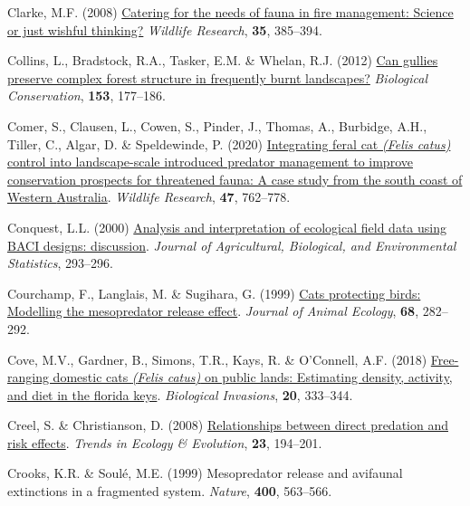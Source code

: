 \documentclass[11pt,a4paper,titlepage,twoside,openright]{style/unimelbthesis}
\newenvironment{CSLReferences}%
  {}%
  {\par}
\begin{document}
\begin{mainmatter}
\begin{CSLReferences}{1}{0}
\leavevmode{}%
Clarke, M.F. (2008) \href{https://doi.org/10.1071/WR07137}{Catering for the needs of fauna in fire management: Science or just wishful thinking?} \emph{Wildlife Research}, \textbf{35}, 385--394.

\leavevmode{}%
Collins, L., Bradstock, R.A., Tasker, E.M. \& Whelan, R.J. (2012) \href{https://doi.org/10.1016/j.biocon.2012.04.021}{Can gullies preserve complex forest structure in frequently burnt landscapes?} \emph{Biological Conservation}, \textbf{153}, 177--186.

\leavevmode{}%
Comer, S., Clausen, L., Cowen, S., Pinder, J., Thomas, A., Burbidge, A.H., Tiller, C., Algar, D. \& Speldewinde, P. (2020) \href{https://doi.org/10.1071/WR19217}{Integrating feral cat \emph{({Felis catus})} control into landscape-scale introduced predator management to improve conservation prospects for threatened fauna: A case study from the south coast of {Western {A}ustralia}}. \emph{Wildlife Research}, \textbf{47}, 762--778.

\leavevmode{}%
Conquest, L.L. (2000) \href{https://doi.org/10.2307/1400455}{Analysis and interpretation of ecological field data using {BACI} designs: discussion}. \emph{Journal of Agricultural, Biological, and Environmental Statistics}, 293--296.

\leavevmode{}%
Courchamp, F., Langlais, M. \& Sugihara, G. (1999) \href{https://doi.org/10.1046/j.1365-2656.1999.00285.x}{Cats protecting birds: Modelling the mesopredator release effect}. \emph{Journal of Animal Ecology}, \textbf{68}, 282--292.

\leavevmode{}%
Cove, M.V., Gardner, B., Simons, T.R., Kays, R. \& O'Connell, A.F. (2018) \href{https://doi.org/10.1007/s10530-017-1534-x}{Free-ranging domestic cats \emph{({Felis catus})} on public lands: Estimating density, activity, and diet in the florida keys}. \emph{Biological Invasions}, \textbf{20}, 333--344.

\leavevmode{}%
Creel, S. \& Christianson, D. (2008) \href{https://doi.org/10.1016/j.tree.2007.12.004}{Relationships between direct predation and risk effects}. \emph{Trends in Ecology \& Evolution}, \textbf{23}, 194--201.

\leavevmode{}%
Crooks, K.R. \& Soulé, M.E. (1999) Mesopredator release and avifaunal extinctions in a fragmented system. \emph{Nature}, \textbf{400}, 563--566.


\end{CSLReferences}
\end{mainmatter}
\end{document}
